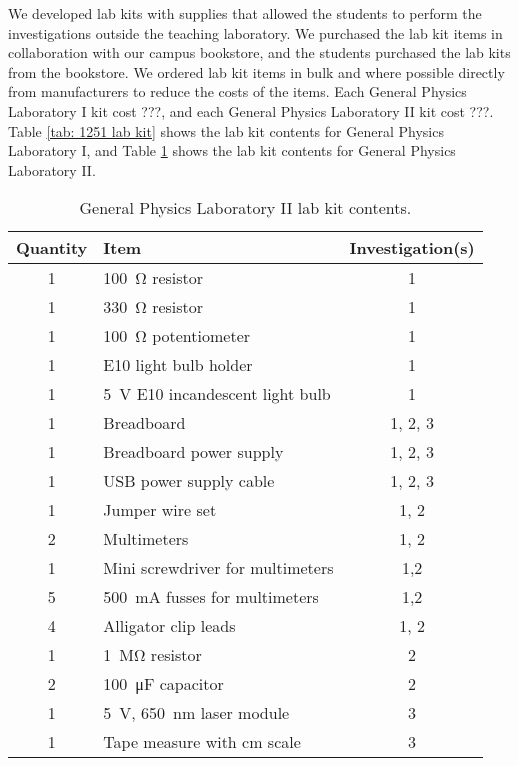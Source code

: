 \documentclass[aip, numerical, preprint]{revtex4-2}
\begin{document}
We developed lab kits with supplies that allowed the students to perform the investigations outside the teaching laboratory. We purchased the lab kit items in collaboration with our campus bookstore, and the students purchased the lab kits from the bookstore. We ordered lab kit items in bulk and where possible directly from manufacturers to reduce the costs of the items. Each General Physics Laboratory I kit cost ???, and each General Physics Laboratory II kit cost ???. Table \ref{tab: 1251 lab kit} shows the lab kit contents for General Physics Laboratory I, and Table \ref{tab: 1261 lab kit} shows the lab kit contents for General Physics Laboratory II.

 \begin{table}
    \caption{\label{tab: 1261 lab kit} General Physics Laboratory II lab kit contents.}
        \begin{tabular}{clc}
            \hline\hline
            Quantity & Item & Investigation(s)\\
            \hline
            1 & \SI{100}{\ohm} resistor & 1 \\
            1 & \SI{330}{\ohm} resistor & 1 \\
            1 &  \SI{100}{\ohm} potentiometer & 1 \\
            1 & E10 light bulb holder & 1 \\
            1 & \SI{5}{V} E10 incandescent light bulb & 1 \\
            1 & Breadboard & 1, 2, 3 \\
            1 & Breadboard power supply & 1, 2, 3 \\
            1 & USB power supply cable & 1, 2, 3 \\
            1 & Jumper wire set & 1, 2 \\
            2 & Multimeters & 1, 2 \\
            1 & Mini screwdriver for multimeters & 1,2 \\
            5 & \SI{500}{mA} fusses for multimeters & 1,2 \\
            4 & Alligator clip leads & 1, 2 \\
            1 & \SI{1}{\mega\ohm} resistor & 2 \\
            2 & \SI{100}{\micro\farad} capacitor & 2 \\
            1 & \SI{5}{V}, \SI{650}{nm} laser module & 3 \\
            1 & Tape measure with cm scale & 3 \\            
            \hline\hline
        \end{tabular}
\end{table}
\end{document}
